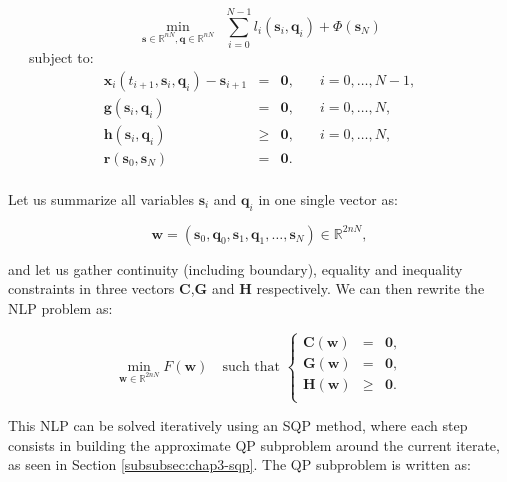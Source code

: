 \begin{equation}
  \min_{\mathbf{s}\in\mathbb R^{nN},\mathbf{q}\in\mathbb R^{nN}}
  \ \ \sum_{i=0}^{N-1}l_i(\mathbf{s}_i,\mathbf{q}_i) +
  \Phi(\mathbf{s}_N)
\end{equation}
\ \ \ subject to:
\begin{equation}
  \begin{array}{rcll}
   \mathbf{x}_i(t_{i+1},\mathbf{s}_i,\mathbf{q}_i) - \mathbf{s}_{i+1} &
    = & \mathbf{0}, & \quad i=0,\ldots,N-1,\\%
    \mathbf{g}(\mathbf{s}_i,\mathbf{q}_i) & = & \mathbf{0}, & \quad i=0,\ldots,N,%
    \\%
    \mathbf{h}(\mathbf{s}_i,\mathbf{q}_i) & \ge & \mathbf{0}, & \quad i=0,\ldots,N,%
    \\%
    \mathbf{r} (\mathbf{s}_0,\mathbf{s}_N) & = & \mathbf{0}.%
    \\%
  \end{array}
\end{equation} 

Let us summarize all variables $\mathbf{s}_i$ and $\mathbf{q}_i$ in
one single vector as:

\begin{equation}
\mathbf{w}=(\mathbf{s}_0,\mathbf{q}_0,\mathbf{s}_1,\mathbf{q}_1,\ldots,\mathbf{s}_N)
\in \mathbb R^{2nN},
\end{equation} 

\noindent and let us gather continuity (including boundary), equality and
inequality constraints in three vectors $\mathbf{C}$,$\mathbf{G}$ and
$\mathbf{H}$ respectively. We can then rewrite the NLP problem as:

\begin{equation}
  \min_{\mathbf{w}\in\mathbb R^{2nN}}F(\mathbf{w}) \quad\text{such that }
  \left\{
    \begin{array}{rcl}
      \mathbf{C}(\mathbf{w}) &=& \mathbf{0},\\
      \mathbf{G}(\mathbf{w}) &=& \mathbf{0},\\
      \mathbf{H}(\mathbf{w}) &\ge& \mathbf{0}.\\
    \end{array}
    \right.
\end{equation}

This NLP can be solved iteratively using an SQP method, where each
step consists in building the approximate QP subproblem around the
current iterate, as seen in Section \ref{subsubsec:chap3-sqp}. The QP
subproblem is written as:

